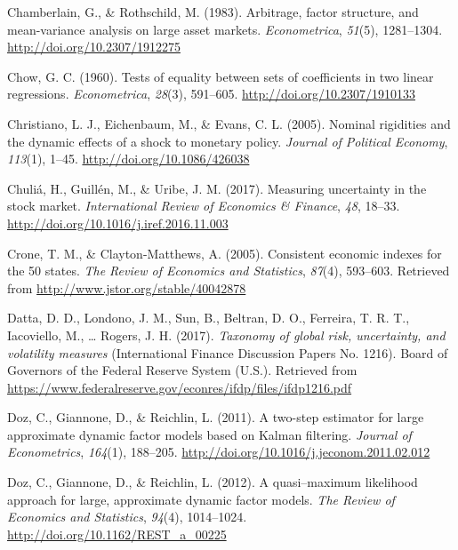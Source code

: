 \documentclass[12pt,twoside]{reedthesis}
\begin{document}
\leavevmode\hypertarget{ref-chamroth:1983}{}%
Chamberlain, G., \& Rothschild, M. (1983). Arbitrage, factor structure, and mean-variance analysis on large asset markets. \emph{Econometrica}, \emph{51}(5), 1281--1304. \url{http://doi.org/10.2307/1912275}

\leavevmode\hypertarget{ref-chow:1960}{}%
Chow, G. C. (1960). Tests of equality between sets of coefficients in two linear regressions. \emph{Econometrica}, \emph{28}(3), 591--605. \url{http://doi.org/10.2307/1910133}

\leavevmode\hypertarget{ref-chrietal:2005}{}%
Christiano, L. J., Eichenbaum, M., \& Evans, C. L. (2005). Nominal rigidities and the dynamic effects of a shock to monetary policy. \emph{Journal of Political Economy}, \emph{113}(1), 1--45. \url{http://doi.org/10.1086/426038}

\leavevmode\hypertarget{ref-chuletal:2017}{}%
Chuliá, H., Guillén, M., \& Uribe, J. M. (2017). Measuring uncertainty in the stock market. \emph{International Review of Economics \& Finance}, \emph{48}, 18--33. \url{http://doi.org/10.1016/j.iref.2016.11.003}

\leavevmode\hypertarget{ref-cronclay:2005}{}%
Crone, T. M., \& Clayton-Matthews, A. (2005). Consistent economic indexes for the 50 states. \emph{The Review of Economics and Statistics}, \emph{87}(4), 593--603. Retrieved from \url{http://www.jstor.org/stable/40042878}

\leavevmode\hypertarget{ref-dattetal:2017}{}%
Datta, D. D., Londono, J. M., Sun, B., Beltran, D. O., Ferreira, T. R. T., Iacoviello, M., \ldots{} Rogers, J. H. (2017). \emph{Taxonomy of global risk, uncertainty, and volatility measures} (International Finance Discussion Papers No. 1216). Board of Governors of the Federal Reserve System (U.S.). Retrieved from \url{https://www.federalreserve.gov/econres/ifdp/files/ifdp1216.pdf}

\leavevmode\hypertarget{ref-dozetal:2011}{}%
Doz, C., Giannone, D., \& Reichlin, L. (2011). A two-step estimator for large approximate dynamic factor models based on Kalman filtering. \emph{Journal of Econometrics}, \emph{164}(1), 188--205. \url{http://doi.org/10.1016/j.jeconom.2011.02.012}

\leavevmode\hypertarget{ref-dozetal:2012}{}%
Doz, C., Giannone, D., \& Reichlin, L. (2012). A quasi--maximum likelihood approach for large, approximate dynamic factor models. \emph{The Review of Economics and Statistics}, \emph{94}(4), 1014--1024. \url{http://doi.org/10.1162/REST_a_00225}
\end{document}
